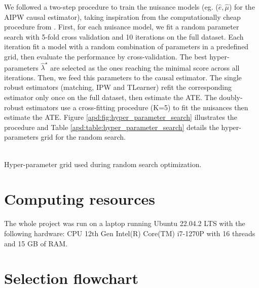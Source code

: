 \documentclass[french,12pt,twoside,a4paper]{book}
\begin{document}
\begin{appendices}
  We followed a two-step procedure to train the nuisance models (eg. ($\hat e,
    \hat \mu$) for the AIPW causal estimator), taking inspiration from the
  computationally cheap procedure from
  \cite[section~3.3]{bouthillier2021accounting}. First, for each nuisance
  model, we fit a random parameter search with 5-fold cross validation and 10
  iterations on the full dataset. Each iteration fit a model with a random
  combination of parameters in a predefined grid, then evaluate the
  performance by cross-validation. The best hyper-parameters $\hat
    \lambda^{\star}$ are selected as the ones reaching the minimal score across
  all iterations. Then, we feed this parameters to the causal estimator. The
  single robust estimators (matching, IPW and TLearner) refit the
  corresponding estimator only once on the full dataset, then estimate the
  ATE. The doubly-robust estimators use a cross-fitting procedure (K=5) to fit
  the nuisances then estimate the ATE. Figure
  \ref{apd:fig:hyper_parameter_search} illustrates the procedure and Table
  \ref{apd:table:hyper_parameter_search} details the hyper-parameters grid for
  the random search.


  \begin{table}[]
    \resizebox{\textwidth}{!}{%
      
    }\\
    \caption{Hyper-parameter grid used during random search
      optimization.}\label{apd:table:hyper_parameter_search}
  \end{table}


  \section{Computing resources}

  The whole project was run on a laptop running Ubuntu 22.04.2 LTS with the following hardware:
  CPU 12th Gen Intel(R) Core(TM) i7-1270P with 16 threads and 15 GB of RAM.

  \section{Selection flowchart}\label{apd:selection_flowchart}


\end{appendices}
\end{document}
